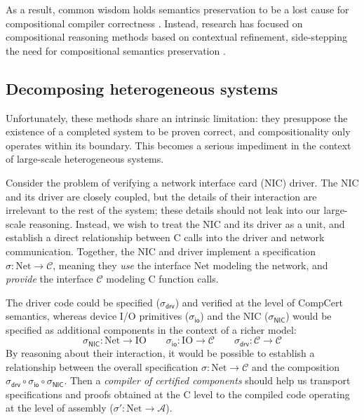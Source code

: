 \documentclass[sigplan,screen,review]{acmart}
\newcommand{\kw}[1]{\ensuremath{ \mathsf{#1} }}
\newcommand{\li}[1]{\mathrm{#1}}
\begin{document}
As a result,
common wisdom holds semantics preservation
to be a lost cause
for compositional compiler correctness \cite{next700}.
Instead,
research has focused on
compositional reasoning methods
based on contextual refinement,
side-stepping the need for compositional semantics preservation
\cite{sepcompcert,compcertm}.


\subsection{Decomposing heterogeneous systems} %

Unfortunately,
these methods share an intrinsic limitation:
they presuppose the existence of a completed system
to be proven correct,
and compositionality only operates within its boundary.
This becomes a serious impediment
in the context of large-scale heterogeneous systems.

\begin{example} \label{ex:nicdriver} %
Consider the problem of verifying
a network interface card (NIC) driver.
The NIC and its driver are closely coupled,
but the details of their interaction
are irrelevant to the rest of the system;
these details should not leak into our large-scale reasoning.
Instead,
we wish to treat the NIC and its driver as a unit,
and establish a direct relationship between C calls into
the driver and network communication.
Together, the NIC and driver implement
a specification $\sigma :
\li{Net} \rightarrow \mathcal{C}$,
meaning they \emph{use} the interface $\li{Net}$
modeling the network,
and \emph{provide} the interface $\mathcal{C}$
modeling C function calls.

The driver code could be specified
($\sigma_\kw{drv}$)
and verified
at the level of CompCert semantics,
whereas device I/O primitives
($\sigma_\kw{io}$)
and the NIC
($\sigma_\kw{NIC}$)
would be specified as additional components
in the context of a richer model:
\[
  \sigma_\kw{NIC} : \li{Net} \rightarrow \li{IO}
  \qquad
  \sigma_\kw{io} : \li{IO} \rightarrow \mathcal{C}
  \qquad
  \sigma_\kw{drv} : \mathcal{C} \rightarrow \mathcal{C}
\]
By reasoning about their interaction,
it would be possible to establish a relationship between
the overall specification $\sigma : \li{Net} \rightarrow \mathcal{C}$ and
the composition
$\sigma_\kw{drv} \circ \sigma_\kw{io} \circ \sigma_\kw{NIC}$.
Then a \emph{compiler of certified components}
should help us transport specifications and proofs
obtained at the C level %
to the compiled code operating at the level of assembly
($\sigma' : \li{Net} \rightarrow \mathcal{A}$).
\end{example}
\end{document}
